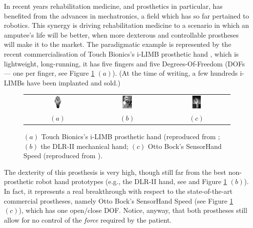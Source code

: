 In recent years rehabilitation medicine, and prosthetics in
particular, has benefited from the advances in mechatronics, a field
which has so far pertained to robotics. This synergy is driving
rehabilitation medicine to a scenario in which an amputee's life will
be better, when more dexterous and controllable prostheses will make
it to the market. The paradigmatic example is represented by the
recent commercialisation of Touch Bionics's i-LIMB prosthetic hand
\cite{ilimb}, which is lightweight, long-running, it has five fingers
and five Degrees-Of-Freedom (DOFs --- one per finger, see Figure
\ref{fig:hands} $(a)$). (At the time of writing, a few hundreds i-LIMBs
have been implanted and sold.)

\begin{figure}
  \begin{tabular}{ccc}
    \includegraphics[width=0.14\textwidth]{figs/hands_TB.jpg} &
    \includegraphics[width=0.14\textwidth]{figs/hands_DLRII.jpg} &
    \includegraphics[width=0.14\textwidth]{figs/hands_OB.jpg} \\
    $(a)$ & $(b)$ & $(c)$
  \end{tabular}
  \caption{$(a)$ Touch Bionics's i-LIMB prosthetic hand (reproduced
    from \cite{ilimb}; $(b)$ the DLR-II mechanical hand; $(c)$ Otto
    Bock's SensorHand Speed (reproduced from \cite{sensorhand}).}
  \label{fig:hands}
\end{figure}

The dexterity of this prosthesis is very high, though still far from
the best non-prosthetic robot hand prototypes (e.g., the DLR-II hand,
see \cite{Hua2006} and Figure \ref{fig:hands} $(b)$). In fact, it
represents a real breakthrough with respect to the state-of-the-art
commercial prostheses, namely Otto Bock's SensorHand Speed (see Figure
\ref{fig:hands} $(c)$), which has one open/close DOF. Notice, anyway,
that both prostheses still allow for no control of the \emph{force}
required by the patient.

